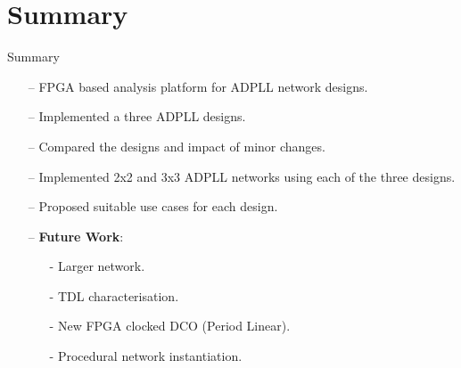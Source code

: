 \documentclass{beamer}
\begin{document}
\section*{Summary}

\begin{frame}{Summary}

    \begin{itemize}
        \item[--]
            FPGA based analysis platform for ADPLL network designs.
        \item[--]
            Implemented a three ADPLL designs.
        \item[--]
            Compared the designs and impact of minor changes.
        \item[--]
            Implemented 2x2 and 3x3 ADPLL networks using each of the three designs.
        \item[--]
            Proposed suitable use cases for each design.
        \item[--]
       		\textbf{Future Work}:
        \begin{itemize}
            \item[-]
            	Larger network.
            \item[-]
            	TDL characterisation.
            \item[-]
            	New FPGA clocked DCO (Period Linear).
           	\item[-]
            	Procedural network instantiation.
        \end{itemize}
    \end{itemize}

\end{frame}
\end{document}
